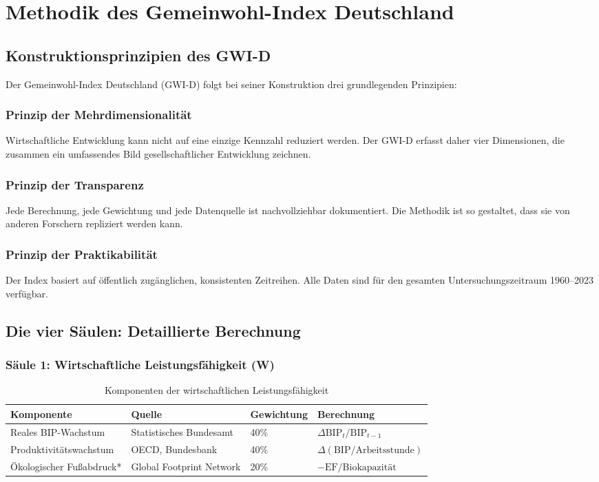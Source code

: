 \chapter{Methodik des Gemeinwohl-Index Deutschland}

\section{Konstruktionsprinzipien des GWI-D}

Der Gemeinwohl-Index Deutschland (GWI-D) folgt bei seiner Konstruktion drei grundlegenden Prinzipien:

\subsection{Prinzip der Mehrdimensionalität}
Wirtschaftliche Entwicklung kann nicht auf eine einzige Kennzahl reduziert werden. Der GWI-D erfasst daher vier Dimensionen, die zusammen ein umfassendes Bild gesellschaftlicher Entwicklung zeichnen.

\subsection{Prinzip der Transparenz}
Jede Berechnung, jede Gewichtung und jede Datenquelle ist nachvollziehbar dokumentiert. Die Methodik ist so gestaltet, dass sie von anderen Forschern repliziert werden kann.

\subsection{Prinzip der Praktikabilität}
Der Index basiert auf öffentlich zugänglichen, konsistenten Zeitreihen. Alle Daten sind für den gesamten Untersuchungszeitraum 1960--2023 verfügbar.

\section{Die vier Säulen: Detaillierte Berechnung}

\subsection{Säule 1: Wirtschaftliche Leistungsfähigkeit (W)}

\begin{table}[h]
\centering
\begin{tabular}{llll}
\toprule
\textbf{Komponente} & \textbf{Quelle} & \textbf{Gewichtung} & \textbf{Berechnung} \\
\midrule
Reales BIP-Wachstum & Statistisches Bundesamt & 40\% & $\Delta \text{BIP}_{t}/\text{BIP}_{t-1}$ \\
Produktivitätswachstum & OECD, Bundesbank & 40\% & $\Delta(\text{BIP}/\text{Arbeitsstunde})$ \\
Ökologischer Fußabdruck* & Global Footprint Network & 20\% & $-\text{EF}/\text{Biokapazität}$ \\
\bottomrule
\end{tabular}
\caption{Komponenten der wirtschaftlichen Leistungsfähigkeit}
\label{tab:komponenten-wirtschaft}
\end{table}

